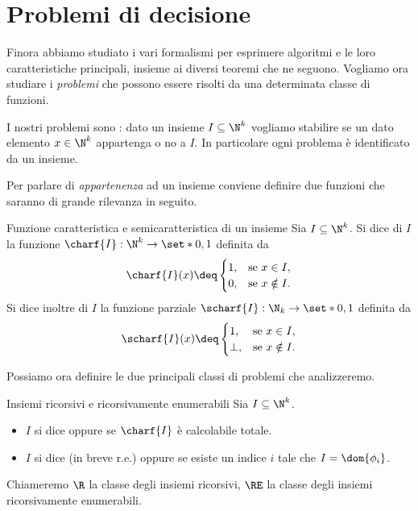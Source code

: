 \section{Problemi di decisione}

Finora abbiamo studiato i vari formalismi per esprimere algoritmi e le loro caratteristiche principali, insieme ai diversi teoremi che ne seguono. Vogliamo ora studiare i \emph{problemi} che possono essere risolti da una determinata classe di funzioni.

I nostri problemi sono : dato un insieme $I \subseteq \N^k$ vogliamo stabilire se un dato elemento $x \in \N^k$ appartenga o no a $I$. In particolare ogni problema è identificato da un insieme.

Per parlare di \emph{appartenenza} ad un insieme conviene definire due funzioni che saranno di grande rilevanza in seguito.

\begin{definition}
    {Funzione caratteristica e semicaratteristica di un insieme}{}
    Sia $I \subseteq \N^k$. 
    Si dice  di $I$ la funzione 
    $\charf{I} : \N^k \to \set*{0,1}$ definita da \[
        \charf{I}(x) \deq \begin{cases}
            1, &\text{se } x \in I,\\
            0, &\text{se } x \notin I.
        \end{cases}
    \] Si dice inoltre  di $I$ la funzione parziale $\scharf{I} : \N_k \to \set*{0, 1}$ definita da \[
        \scharf{I}(x) \deq \begin{cases}
            1, &\text{se } x \in I,\\
            \bot, &\text{se } x \notin I.
        \end{cases}
    \]
\end{definition}

Possiamo ora definire le due principali classi di problemi che analizzeremo.

\begin{definition}
    {Insiemi ricorsivi e ricorsivamente enumerabili}{}
    Sia $I \subseteq \N^k$. \begin{itemize}
        \item $I$ si dice  oppure  se $\charf{I}$ è calcolabile totale.
        \item $I$ si dice  (in breve r.e.) oppure  se esiste un indice $i$ tale che $I = \dom{\phi_i}$.   
    \end{itemize}
    Chiameremo $\R$ la classe degli insiemi ricorsivi, $\RE$ la classe degli insiemi ricorsivamente enumerabili.
\end{definition}

